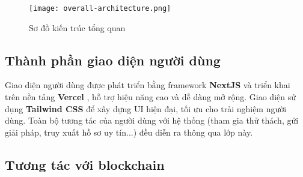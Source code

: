 \begin{figure}[H]

  \texttt{[image: overall-architecture.png]}
  \caption{Sơ đồ kiến trúc tổng quan}
  \label{fig:system-architecture}
\end{figure}

\subsection{Thành phần giao diện người dùng}

Giao diện người dùng được phát triển bằng framework \textbf{NextJS} \cite{nextjs-web} và triển khai trên nền tảng \textbf{Vercel} \cite{vercel-web}, hỗ trợ hiệu năng cao và dễ dàng mở rộng.
Giao diện sử dụng \textbf{Tailwind CSS} \cite{tailwindcss-web} để xây dựng UI hiện đại, tối ưu cho trải nghiệm người dùng. Toàn bộ tương tác của người dùng với hệ thống (tham gia thử thách, gửi giải pháp, truy xuất hồ sơ uy tín...) đều diễn ra thông qua lớp này.

\subsection{Tương tác với blockchain}

